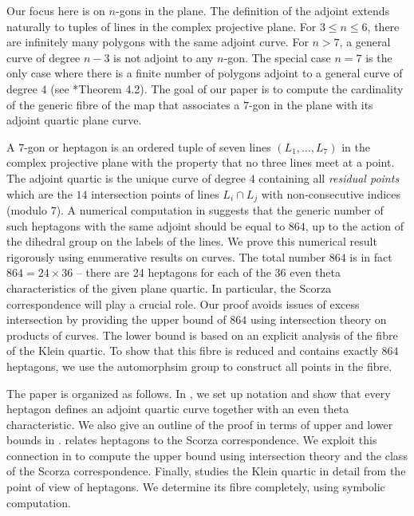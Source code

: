 \documentclass[12pt]{article}
\numberwithin{equation}{section}
\theoremstyle{definition}
\begin{document}
Our focus here is on $n$-gons in the plane. The definition of the adjoint extends naturally to tuples of lines in the complex projective plane. For $3\leq n \leq 6$, there are infinitely many polygons with the same adjoint curve. For $n>7$, a general curve of degree $n-3$ is not adjoint to any $n$-gon. The special case $n=7$ is the only case where there is a finite number of polygons adjoint to a general curve of degree $4$ (see \cite{polypols}*{Theorem 4.2}). The goal of our paper is to compute the cardinality of the generic fibre of the map that associates a $7$-gon in the plane with its adjoint quartic plane curve. 

A $7$-gon or heptagon is an ordered tuple of seven lines $(L_1,\ldots,L_7)$ in the complex projective plane with the property that no three lines meet at a point. The adjoint quartic is the unique curve of degree $4$ containing all \emph{residual points} which are the $14$ intersection points of lines $L_i\cap L_j$ with non-consecutive indices (modulo $7$). A numerical computation in \cite{polypols} suggests that the generic number of such heptagons with the same adjoint should be equal to $864$, up to the action of the dihedral group on the labels of the lines. We prove this numerical result rigorously using enumerative results on curves. The total number $864$ is in fact $864 = 24 \times 36$ -- there are 24 heptagons for each of the $36$ even theta characteristics of the given plane quartic. In particular, the Scorza correspondence will play a crucial role. Our proof avoids issues of excess intersection by providing the upper bound of $864$ using intersection theory on products of curves. The lower bound is based on an explicit analysis of the fibre of the Klein quartic. To show that this fibre is reduced and contains exactly $864$ heptagons, we use the automorphsim group to construct all points in the fibre.

The paper is organized as follows. In , we set up notation and show that every heptagon defines an adjoint quartic curve together with an even theta characteristic. We also give an outline of the proof in terms of upper and lower bounds in .  relates heptagons to the Scorza correspondence. We exploit this connection in  to compute the upper bound using intersection theory and the class of the Scorza correspondence. Finally,  studies the Klein quartic in detail from the point of view of heptagons. We determine its fibre completely, using symbolic computation. 
\end{document}
